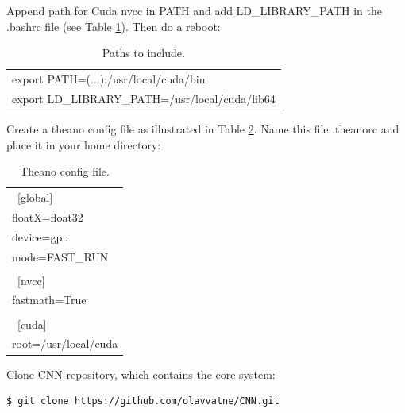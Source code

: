 \noindent Append path for Cuda nvcc in PATH and add LD\_LIBRARY\_PATH in the .bashrc file (see Table \ref{tab:install_bash_paths}). Then do a reboot:

\FloatBarrier
\begin{table}[!htbp]
\caption[Paths to include]{Paths to include.}
\begin{center}
\begin{adjustbox}{max width=\textwidth}
\begin{tabular}{ l }
  \hline			
  export PATH=(...):/usr/local/cuda/bin  \\
  export LD\_LIBRARY\_PATH=/usr/local/cuda/lib64 \\
  \hline  
\end{tabular}
\end{adjustbox}
\end{center}
\label{tab:install_bash_paths}
\end{table}
\FloatBarrier

\noindent  Create a theano config file as illustrated in Table \ref{tab:install_theano_config_file}. Name this file .theanorc and place it in your home directory:\\

\FloatBarrier
\begin{table}[!htbp]
\caption[Theano config file]{Theano config file.}
\begin{center}
\begin{adjustbox}{max width=\textwidth}
\begin{tabular}{ l }
  \hline			
  ~[global] \\
  floatX=float32 \\
  device=gpu \\
  mode=FAST\_RUN \\
  \\
  ~[nvcc] \\
  fastmath=True \\
  \\
  ~[cuda] \\
  root=/usr/local/cuda \\
  \hline  
\end{tabular}
\end{adjustbox}
\end{center}
\label{tab:install_theano_config_file}
\end{table}
\FloatBarrier

\noindent Clone CNN repository, which contains the core system:
\begin{lstlisting}[language=bash]
  $ git clone https://github.com/olavvatne/CNN.git 
\end{lstlisting}
~\\

